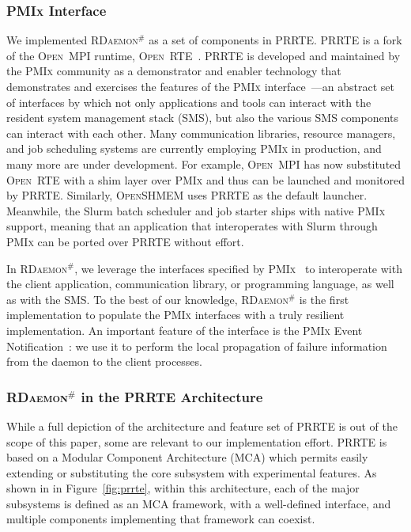 \documentclass[5p,times,twocolumn]{elsarticle}
\newcommand{\prrte}[0]{\textsc{PRRTE}\xspace}
\newcommand{\pmix}[0]{\textsc{PMIx}\xspace}
\newcommand{\orte}[0]{\textsc{Open~RTE}\xspace}
\newcommand{\ompi}[0]{\textsc{Open~MPI}\xspace}
\newcommand{\oshmem}[0]{\textsc{OpenSHMEM}\xspace}
\newcommand{\ourwork}[0]{\textsc{RDaemon}\ensuremath{^\#}\xspace}
\begin{document}
\subsubsection{\pmix Interface}
We implemented \ourwork as a set of components in \prrte. \prrte is a fork of the \ompi runtime, \orte~\cite{Castain05}. \prrte is developed and maintained
by the \pmix community as a demonstrator and enabler technology that demonstrates
and exercises the features of the \pmix interface~\cite{CASTAIN18}---an abstract set of interfaces by which not only applications and tools can interact with the resident system management stack (SMS), but also the various SMS components can interact with each other.
Many communication libraries, resource managers, and job scheduling systems are currently employing \pmix in production, and many more are under development.
For example, \ompi has now substituted \orte with a shim layer over \pmix and thus can be launched and monitored by \prrte.
Similarly, \oshmem uses \prrte as the default launcher.
Meanwhile, the Slurm batch scheduler and job starter ships with native \pmix support, meaning that an application that interoperates with Slurm through \pmix can be ported  over \prrte without effort.

In \ourwork, we leverage the interfaces specified by \pmix~\cite{Ralph15} to interoperate
with the client application, communication library, or programming language, as well as with the
SMS.
To the best of our knowledge, \ourwork is the first
implementation to populate the \pmix interfaces with a truly resilient implementation.
An important feature of the interface is the \pmix Event Notification~\cite{Ralph002}:
we use it to perform the local propagation of failure information from the
daemon to the client processes.

\subsubsection{\ourwork in the \prrte Architecture}

While a full depiction of the architecture and feature set of \prrte is out of the scope of this paper, some are relevant to our implementation effort.
\prrte is based on a Modular Component Architecture (MCA) which permits easily extending or substituting the core subsystem with experimental features.
As shown in in Figure~\ref{fig:prrte}, within this architecture, each of the major subsystems is defined as an MCA framework, with a well-defined interface, and multiple components implementing that framework can coexist.
\end{document}
